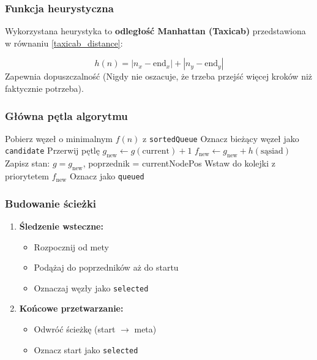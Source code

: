 \documentclass[../../../../doc.tex]{subfiles}
\begin{document}
\subsubsection{Funkcja heurystyczna}
Wykorzystana heurystyka to \textbf{odległość Manhattan (Taxicab)} przedstawiona w równaniu \ref{taxicab_distance}:

\begin{equation}
  h(n) = |n_x - \text{end}_x| + |n_y - \text{end}_y|
  \label{taxicab_distance}
\end{equation}
Zapewnia dopuszczalność (Nigdy nie oszacuje, że trzeba przejść więcej kroków niż faktycznie potrzeba).

\subsubsection{Główna pętla algorytmu}
\begin{algorithmic}
  \STATE Pobierz węzeł o minimalnym $f(n)$ z \texttt{sortedQueue}
  \STATE Oznacz bieżący węzeł jako \texttt{candidate}
  \STATE Przerwij pętlę
  \ENDIF
  \STATE $g_{\text{new}} \gets g(\text{current}) + 1$
  \STATE $f_{\text{new}} \gets g_{\text{new}} + h(\text{sąsiad})$
  \STATE Zapisz stan: $g = g_{\text{new}}$, poprzednik = currentNodePos
  \STATE Wstaw do kolejki z priorytetem $f_{\text{new}}$
  \STATE Oznacz jako \texttt{queued}
  \ENDIF
  \ENDFOR
  \ENDWHILE
\end{algorithmic}

\subsubsection{Budowanie ścieżki}
\begin{enumerate}
  \item \textbf{Śledzenie wsteczne:}
        \begin{itemize}
          \item Rozpocznij od mety
          \item Podążaj do poprzedników aż do startu
          \item Oznaczaj węzły jako \texttt{selected}
        \end{itemize}
  \item \textbf{Końcowe przetwarzanie:}
        \begin{itemize}
          \item Odwróć ścieżkę (start $\rightarrow$ meta)
          \item Oznacz start jako \texttt{selected}
        \end{itemize}
\end{enumerate}
\end{document}
